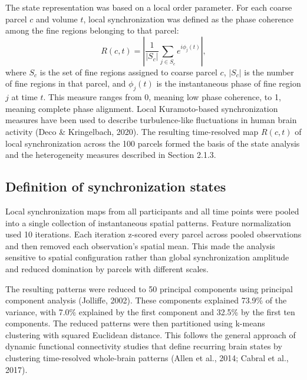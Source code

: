 \documentclass[12pt,a4paper]{report}
\begin{document}
The state representation was based on a local order parameter. For each coarse parcel $c$ and volume $t$, local synchronization was defined as the phase coherence among the fine regions belonging to that parcel:
\begin{equation}
R(c,t)=\left|\frac{1}{|S_c|}\sum_{j\in S_c} e^{i\phi_j(t)}\right|,
\end{equation}
where $S_c$ is the set of fine regions assigned to coarse parcel $c$, $|S_c|$ is the number of fine regions in that parcel, and $\phi_j(t)$ is the instantaneous phase of fine region $j$ at time $t$. This measure ranges from 0, meaning low phase coherence, to 1, meaning complete phase alignment. Local Kuramoto-based synchronization measures have been used to describe turbulence-like fluctuations in human brain activity (Deco \& Kringelbach, 2020). The resulting time-resolved map $R(c,t)$ of local synchronization across the 100 parcels formed the basis of the state analysis and the heterogeneity measures described in Section 2.1.3.

\subsection{Definition of synchronization states}

Local synchronization maps from all participants and all time points were pooled into a single collection of instantaneous spatial patterns. Feature normalization used 10 iterations. Each iteration z-scored every parcel across pooled observations and then removed each observation's spatial mean. This made the analysis sensitive to spatial configuration rather than global synchronization amplitude and reduced domination by parcels with different scales.

The resulting patterns were reduced to 50 principal components using principal component analysis (Jolliffe, 2002). These components explained 73.9\% of the variance, with 7.0\% explained by the first component and 32.5\% by the first ten components. The reduced patterns were then partitioned using k-means clustering with squared Euclidean distance. This follows the general approach of dynamic functional connectivity studies that define recurring brain states by clustering time-resolved whole-brain patterns (Allen et al., 2014; Cabral et al., 2017).
\end{document}
